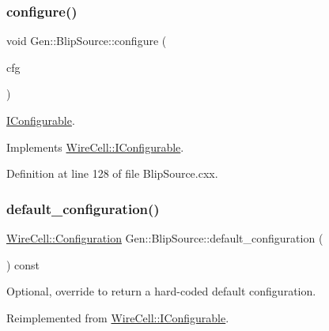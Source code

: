 \subsubsection{\texorpdfstring{configure()}{configure()}}
{\footnotesize\ttfamily void Gen\+::\+Blip\+Source\+::configure (\begin{DoxyParamCaption}\item[{const \hyperlink{namespace_wire_cell_a9f705541fc1d46c608b3d32c182333ee}{Wire\+Cell\+::\+Configuration} \&}]{cfg }\end{DoxyParamCaption})\hspace{0.3cm}{\ttfamily [virtual]}}



\hyperlink{class_wire_cell_1_1_i_configurable}{I\+Configurable}. 



Implements \hyperlink{class_wire_cell_1_1_i_configurable_a57ff687923a724093df3de59c6ff237d}{Wire\+Cell\+::\+I\+Configurable}.



Definition at line 128 of file Blip\+Source.\+cxx.

\mbox{\label{class_wire_cell_1_1_gen_1_1_blip_source_a742f52a1859a3fac4c92fa2d8753d73f}} 
\subsubsection{\texorpdfstring{default\+\_\+configuration()}{default\_configuration()}}
{\footnotesize\ttfamily \hyperlink{namespace_wire_cell_a9f705541fc1d46c608b3d32c182333ee}{Wire\+Cell\+::\+Configuration} Gen\+::\+Blip\+Source\+::default\+\_\+configuration (\begin{DoxyParamCaption}{ }\end{DoxyParamCaption}) const\hspace{0.3cm}{\ttfamily [virtual]}}



Optional, override to return a hard-\/coded default configuration. 



Reimplemented from \hyperlink{class_wire_cell_1_1_i_configurable_a54841b2da3d1ea02189478bff96f7998}{Wire\+Cell\+::\+I\+Configurable}.



